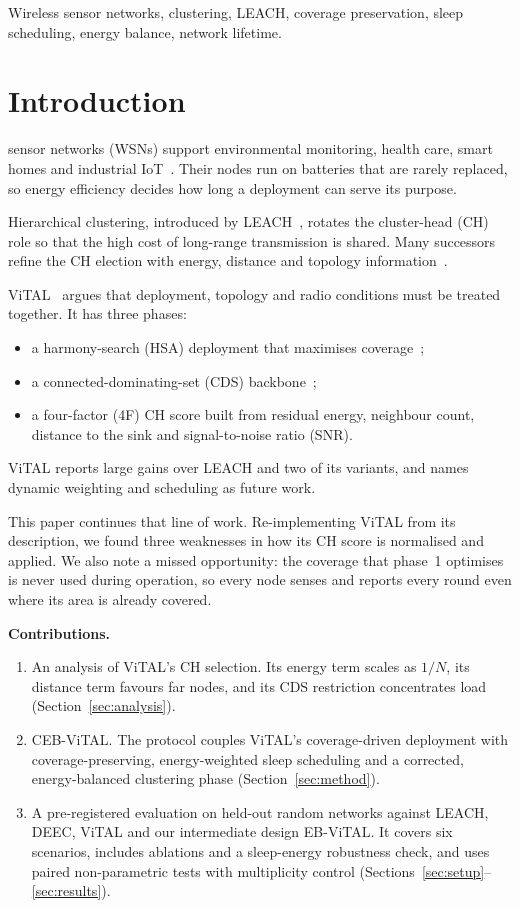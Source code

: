 \documentclass[journal]{IEEEtran}
\begin{document}
\begin{IEEEkeywords}
Wireless sensor networks, clustering, LEACH, coverage preservation, sleep scheduling, energy balance, network lifetime.
\end{IEEEkeywords}

\section{Introduction}
 sensor networks (WSNs) support environmental monitoring, health care, smart homes and industrial IoT~\cite{akyildiz2002survey}. Their nodes run on batteries that are rarely replaced, so energy efficiency decides how long a deployment can serve its purpose.

Hierarchical clustering, introduced by LEACH~\cite{heinzelman2000leach,heinzelman2002leachc}, rotates the cluster-head (CH) role so that the high cost of long-range transmission is shared. Many successors refine the CH election with energy, distance and topology information~\cite{smaragdakis2004sep,younis2004heed,qing2006deec,mohamed2026clustering}.

ViTAL~\cite{ali2025vital} argues that deployment, topology and radio conditions must be treated together. It has three phases:
\begin{itemize}
\item a harmony-search (HSA) deployment that maximises coverage~\cite{geem2001harmony,alia2017hsa};
\item a connected-dominating-set (CDS) backbone~\cite{guha1998cds};
\item a four-factor (4F) CH score built from residual energy, neighbour count, distance to the sink and signal-to-noise ratio (SNR).
\end{itemize}
ViTAL reports large gains over LEACH and two of its variants, and names dynamic weighting and scheduling as future work.

This paper continues that line of work. Re-implementing ViTAL from its description, we found three weaknesses in how its CH score is normalised and applied. We also note a missed opportunity: the coverage that phase~1 optimises is never used during operation, so every node senses and reports every round even where its area is already covered.

\textbf{Contributions.}
\begin{enumerate}
\item An analysis of ViTAL's CH selection. Its energy term scales as $1/N$, its distance term favours far nodes, and its CDS restriction concentrates load (Section~\ref{sec:analysis}).
\item CEB-ViTAL. The protocol couples ViTAL's coverage-driven deployment with coverage-preserving, energy-weighted sleep scheduling and a corrected, energy-balanced clustering phase (Section~\ref{sec:method}).
\item A pre-registered evaluation on held-out random networks against LEACH, DEEC, ViTAL and our intermediate design EB-ViTAL. It covers six scenarios, includes ablations and a sleep-energy robustness check, and uses paired non-parametric tests with multiplicity control (Sections~\ref{sec:setup}--\ref{sec:results}).
\end{enumerate}
\end{document}
